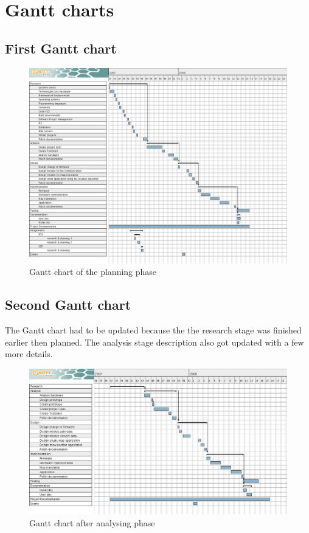 \chapter{Gantt charts}
 \section{First Gantt chart}
  \begin{figure}[h]
   \includegraphics[scale=0.42,angle=90]{images/1_Gantt.png}
   \caption{Gantt chart of the planning phase}
   \label{fg:firstGantt}
  \end{figure}
 
 \section{Second Gantt chart}
  The Gantt chart had to be updated because the the research stage was finished earlier then planned. The analysis stage description also got updated with a few more details.
  \begin{figure}[h]
   \includegraphics[scale=0.47,angle=90]{images/2_Gantt.png}
   \caption{Gantt chart after analysing phase}
   \label{fg:secondGantt}
  \end{figure}
